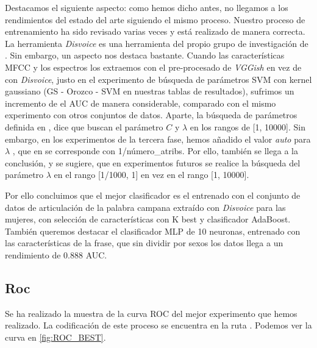 \begin{tcolorbox}
Destacamos el siguiente aspecto: como hemos dicho antes, no llegamos a los rendimientos del estado del arte siguiendo el mismo proceso. Nuestro proceso de entrenamiento ha sido revisado varias veces y está realizado de manera correcta. La herramienta \textit{Disvoice} es una herramienta del propio grupo de investigación de \cite{Orz2016}. Sin embargo, un aspecto nos destaca bastante. Cuando las características MFCC y los espectros los extraemos con el pre-procesado de \textit{VGGish} en vez de con \textit{Disvoice}, justo en el experimento de búsqueda de parámetros SVM con kernel gaussiano (GS - Orozco - SVM en nuestras tablas de resultados), sufrimos un incremento de el AUC de manera considerable, comparado con el mismo experimento con otros conjuntos de datos. Aparte, la búsqueda de parámetros definida en \cite{Orz2016}, dice que buscan el parámetro $C$ y $\lambda$ en los rangos de [1, 10000]. Sin embargo, en los experimentos de la tercera fase, hemos añadido el valor  \textit{auto} para $\lambda$ , que en  se corresponde con 1/número\_atribs. Por ello, también se llega a la conclusión, y se sugiere, que en experimentos futuros se realice la búsqueda del parámetro $\lambda$ en el rango [1/1000, 1] en vez en el rango [1, 10000].
\end{tcolorbox}

Por ello concluimos que el mejor clasificador es el entrenado con el conjunto de datos de articulación de la palabra campana extraído con \textit{Disvoice} para las mujeres, con selección de características con K best y clasificador AdaBoost. También queremos destacar el clasificador MLP de 10 neuronas, entrenado con las características  de la frase, que sin dividir por sexos los datos llega a un rendimiento de 0.888 AUC. 

\subsection{Roc}
Se ha realizado la muestra de la curva ROC del mejor experimento que hemos realizado. La codificación de este proceso se encuentra en la ruta . Podemos ver la curva en \ref{fig:ROC_BEST}.


